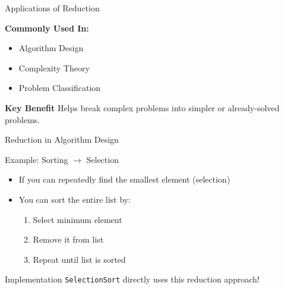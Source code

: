 \documentclass{beamer}
\begin{document}
\begin{frame}{Applications of Reduction}
    \begin{block}{\Large \textbf{Commonly Used In:}}
        \begin{itemize}
            \item {Algorithm Design}
            \item {Complexity Theory}
            \item {Problem Classification}
        \end{itemize}
    \end{block}
    \begin{block}{\large \textbf{Key Benefit}}
        Helps break complex problems into simpler or already-solved problems.
    \end{block}
\end{frame}

\begin{frame}{Reduction in Algorithm Design}
    \begin{exampleblock}{Example: Sorting $\rightarrow$ Selection}
        \begin{itemize}
            \item If you can repeatedly find the smallest element (selection)
            \item You can sort the entire list by:
            \begin{enumerate}
                \item Select minimum element
                \item Remove it from list
                \item Repeat until list is sorted
            \end{enumerate}
        \end{itemize}
    \end{exampleblock}
    
    \begin{alertblock}{Implementation}
        \texttt{SelectionSort} directly uses this reduction approach!
    \end{alertblock}
\end{frame}
\end{document}

